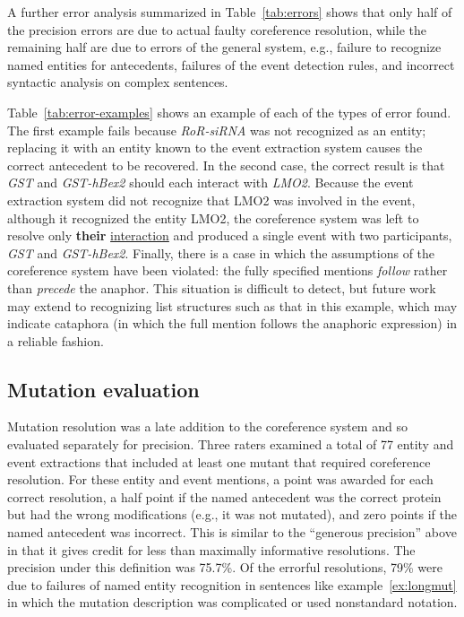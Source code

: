 A further error analysis summarized in Table~\ref{tab:errors} shows that only half of the precision errors are due to actual faulty coreference resolution, while the remaining half are due to errors of 
the general system, e.g., failure to recognize named entities for antecedents, failures of the 
event detection rules, and incorrect syntactic analysis on complex sentences.

Table~\ref{tab:error-examples} shows an example of each of the types of error found. The first example fails because {\it RoR-siRNA} was not recognized as an entity; replacing it with an entity known to the event extraction system causes the correct antecedent to be recovered. In the second case, the correct result is that {\it GST} and {\it GST-hBex2} should each interact with {\it LMO2}. Because the event extraction system did not recognize that LMO2 was involved in the event, although it recognized the entity LMO2, the coreference system was left to resolve only {\bf their} \underline{interaction} and produced a single event with two participants, {\it GST} and {\it GST-hBex2}. Finally, there is a case in which the assumptions of the coreference system have been violated: the fully specified mentions {\it follow} rather than {\it precede} the anaphor. This situation is difficult to detect, but future work may extend to recognizing list structures such as that in this example, which may indicate cataphora (in which the full mention follows the anaphoric expression) in a reliable fashion.

\subsection{Mutation evaluation}

Mutation resolution was a late addition to the coreference system and so evaluated separately for precision. Three raters examined a total of 77 entity and event extractions that included at least one mutant that required coreference resolution. For these entity and event mentions, a point was awarded for each correct resolution, a half point if the named antecedent was the correct protein but had the wrong modifications (e.g., it was not mutated), and zero points if the named antecedent was incorrect. This is similar to the ``generous precision'' above in that it gives credit for less than maximally informative resolutions. The precision under this definition was 75.7\%. Of the errorful resolutions, 79\% were due to failures of named entity recognition in sentences like example~\ref{ex:longmut} in which the mutation description was complicated or used nonstandard notation. 

